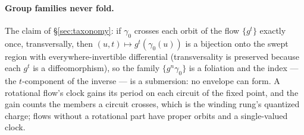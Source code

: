 \paragraph{Group families never fold.} The claim of \S\ref{sec:taxonomy}:
if $\gamma_0$ crosses each orbit of the flow $\{g^t\}$ exactly once,
transversally, then $(u,t)\mapsto g^t(\gamma_0(u))$ is a bijection onto the
swept region with everywhere-invertible differential (transversality is
preserved because each $g^t$ is a diffeomorphism), so the family
$\{g^n\gamma_0\}$ is a foliation and the index --- the $t$-component of the
inverse --- is a submersion: no envelope can form. A rotational flow's clock
gains its period on each circuit of the fixed point, and the gain counts the
members a circuit crosses, which is the winding rung's quantized charge;
flows without a rotational part have proper orbits and a single-valued
clock.
